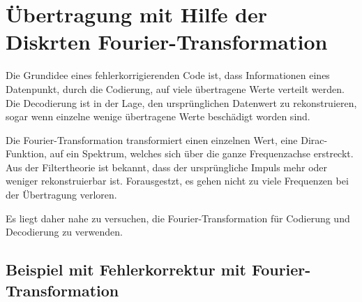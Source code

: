 %
%
\section{Übertragung mit Hilfe der Diskrten Fourier-Transformation
\label{reedsolomon:section:dtf}}
Die Grundidee eines fehlerkorrigierenden Code ist, dass Informationen eines Datenpunkt, 
durch die Codierung, auf viele übertragene Werte verteilt werden.
Die Decodierung ist in der Lage, den ursprünglichen Datenwert zu rekonstruieren,
sogar wenn einzelne wenige übertragene Werte beschädigt worden sind.
\par
Die Fourier-Transformation transformiert einen einzelnen Wert, 
eine Dirac-Funktion, auf ein Spektrum, welches sich über die ganze Frequenzachse erstreckt.
Aus der Filtertheorie ist bekannt, dass der ursprüngliche Impuls mehr oder weniger rekonstruierbar ist.
Forausgestzt, es gehen nicht zu viele Frequenzen bei der Übertragung verloren.
\par
Es liegt daher nahe zu versuchen, die Fourier-Transformation 
für Codierung und Decodierung zu verwenden.

\subsection{Beispiel mit Fehlerkorrektur mit Fourier-Transformation
\label{reedsolomon:subsection:sendbsp}}

